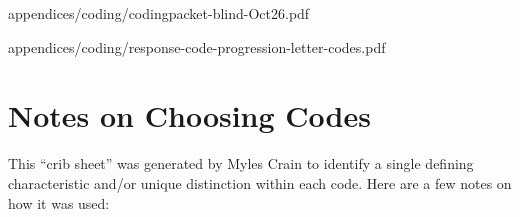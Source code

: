            {appendices/coding/codingpacket-blind-Oct26.pdf}


           {appendices/coding/response-code-progression-letter-codes.pdf}



\section{Notes on Choosing Codes}

This “crib sheet” was generated by Myles Crain to identify a single defining
characteristic and/or unique distinction within each code. Here are a few notes
on how it was used:

